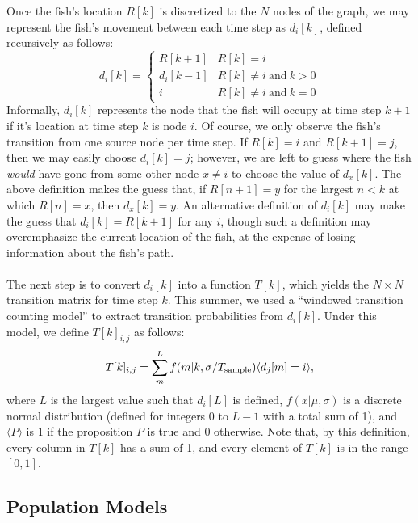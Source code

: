\documentclass[11pt,letterpaper]{article}
\begin{document}
	Once the fish's location $R[k]$ is discretized to the $N$ nodes of the graph, we may represent the fish's movement between each time step as $d_i[k]$, defined recursively as follows:
	\[
	d_i[k] = \left\{
	\begin{array}{ll}
	R[k + 1] & R[k] = i \\
	d_i[k - 1] & R[k] \ne i ~\text{and}~ k > 0 \\
	i & R[k] \ne i ~\text{and}~ k = 0
	\end{array}
	\right.
	\] 
	Informally, $d_i[k]$ represents the node that the fish will occupy at time step $k + 1$ if it's location at time step $k$ is node $i$. Of course, we only observe the fish's transition from one source node per time step. If $R[k] = i$ and $R[k + 1] = j$, then we may easily choose $d_i[k] = j$; however, we are left to guess where the fish \textit{would} have gone from some other node $x \ne i$ to choose the value of $d_x[k]$. The above definition makes the guess that, if $R[n + 1] = y$ for the largest $n < k$ at which $R[n] = x$, then $d_x[k] = y$. An alternative definition of $d_i[k]$ may make the guess that $d_i[k] = R[k + 1]$ for any $i$, though such a definition may overemphasize the current location of the fish, at the expense of losing information about the fish's path.
	\\\\
	The next step is to convert $d_i[k]$ into a function $T[k]$, which yields the $N \times N$ transition matrix for time step $k$. This summer, we used a ``windowed transition counting model'' to extract transition probabilities from $d_i[k]$. Under this model, we define $T[k]_{i,j}$ as follows:
	\[
	T[k]_{i, j} = \sum_m^L f(m | k, \sigma / T_{\rm sample}) \langle d_j[m] = i \rangle,
	\]
	where $L$ is the largest value such that $d_i[L]$ is defined, $f(x | \mu, \sigma)$ is a discrete normal distribution (defined for integers 0 to $L - 1$ with a total sum of 1), and $\langle P \rangle$ is 1 if the proposition $P$ is true and 0 otherwise. Note that, by this definition, every column in $T[k]$ has a sum of 1, and every element of $T[k]$ is in the range $[0, 1]$.
	
	\subsection{Population Models}
	
\end{document}
